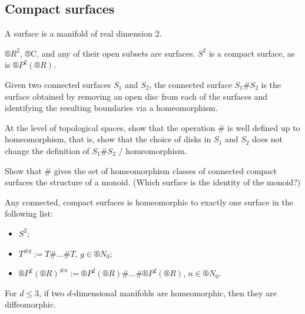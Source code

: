 \documentclass[12pt]{article}					%
\begin{document}
\subsection{Compact surfaces}
\begin{definice}[Surface]
	A surface is a manifold of real dimension 2.
\end{definice}

\begin{priklady}
	$®R^2$, ®C, and any of their open subsets are surfaces. $S^2$ is a compact surface, as is $®P^2(®R)$.
\end{priklady}

\begin{definice}
	Given two connected surfaces $S_1$ and $S_2$, the connected surface $S_1 \# S_2$ is the surface obtained by removing an open disc from each of the surfaces and identifying the resulting boundaries via a homeomorphism.
\end{definice}

\begin{priklad}
	At the level of topological spaces, show that the operation $\#$ is well defined up to homeomorphism, that is, show that the choice of disks in $S_1$ and $S_2$ does not change the definition of $S_1 \# S_2$ / homeomorphism.
\end{priklad}

\begin{priklad}
	Show that $\#$ gives the set of homeomorphism classes of connected compact surfaces the structure of a monoid. (Which surface is the identity of the monoid?)
\end{priklad}

\begin{veta}
	Any connected, compact surfaces is homeomorphic to exactly one surface in the following list:
	\begin{itemize}
		\item $S^2$;
		\item $T^{\# g} := T \# … \# T$, $g \in ®N_0$;
		\item $®P^2(®R)^{\#n} := ®P^2(®R) \# … \# ®P^2(®R)$, $n \in ®N_0$.
	\end{itemize}
\end{veta}


\begin{poznamka}
	For $d ≤ 3$, if two $d$-dimensional manifolds are homeomorphic, then they are diffeomorphic.
\end{poznamka}
\end{document}
